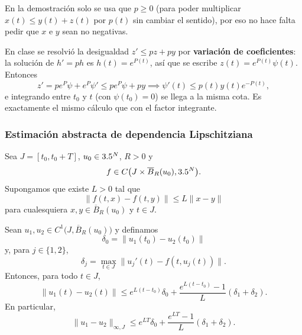 \begin{observación}
    En la demostración solo se usa que $p \geq 0$ (para poder multiplicar $x(t) \leq y(t) + z(t)$ por $p(t)$ sin cambiar el sentido), por eso no hace falta pedir que $x$ e $y$ sean no negativas.

    En clase se resolvió la desigualdad $z' \leq p z + p y$ por \textbf{variación de coeficientes}: la solución de $h' = p h$ es $h(t) = e^{P(t)}$, así que se escribe $z(t) = e^{P(t)} \psi(t)$. Entonces
    \[
        z' = p e^{P} \psi + e^{P} \psi' \leq p e^{P} \psi + p y \implies \psi'(t) \leq p(t) y(t) e^{-P(t)},
    \]
    e integrando entre $t_0$ y $t$ (con $\psi(t_0) = 0$) se llega a la misma cota. Es exactamente el mismo cálculo que con el factor integrante.
\end{observación}

\subsubsection{Estimación abstracta de dependencia Lipschitziana}

\begin{teorema}
    Sea $J=[t_0,t_0+T]$, $u_0\in3.5^N$, $R>0$ y
    \[
        f\in C\bigl(J\times\overline{B}_R(u_0),3.5^N\bigr).
    \]
    Supongamos que existe $L>0$ tal que
    \[
        \|f(t,x)-f(t,y)\|\leq L\|x-y\|
    \]
    para cualesquiera $x,y\in\overline{B}_R(u_0)$ y $t\in J$.

    Sean $u_1,u_2\in C^1\bigl(J,\overline{B}_R(u_0)\bigr)$ y definamos
    \[
        \delta_0=\|u_1(t_0)-u_2(t_0)\|
    \]
    y, para $j\in\{1,2\}$,
    \[
        \delta_j=
        \max_{t\in J}\|u_j'(t)-f(t,u_j(t))\|.
    \]
    Entonces, para todo $t\in J$,
    \[
        \|u_1(t)-u_2(t)\|
        \leq
        e^{L(t-t_0)}\delta_0
        +\frac{e^{L(t-t_0)}-1}{L}(\delta_1+\delta_2).
    \]
    En particular,
    \[
        \|u_1-u_2\|_{\infty,J}
        \leq
        e^{LT}\delta_0
        +\frac{e^{LT}-1}{L}(\delta_1+\delta_2).
    \]
\end{teorema}

